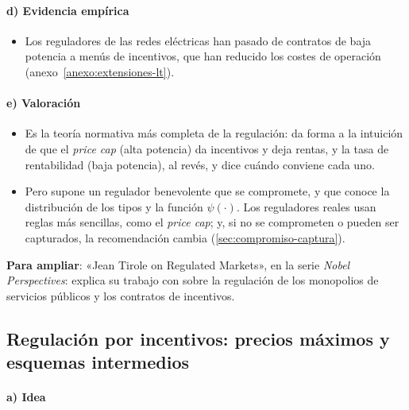 \documentclass[11pt]{article}
\begin{document}
\paragraph{d) Evidencia empírica}

\begin{itemize}
\item Los reguladores de las redes eléctricas han pasado de contratos de baja potencia a menús de incentivos, que han reducido los costes de operación\nocite{Joskow2014Incentive} (anexo~\ref{anexo:extensiones-lt}).
\end{itemize}

\paragraph{e) Valoración}

\begin{itemize}
\item Es la teoría normativa más completa de la regulación: da forma a la intuición de que el \emph{price cap} (alta potencia) da incentivos y deja rentas, y la tasa de rentabilidad (baja potencia), al revés, y dice cuándo conviene cada uno.
\item Pero supone un regulador benevolente que se compromete, y que conoce la distribución de los tipos y la función $\psi(\cdot)$. Los reguladores reales usan reglas más sencillas, como el \emph{price cap}; y, si no se comprometen o pueden ser capturados, la recomendación cambia (\ref{sec:compromiso-captura}).
\end{itemize}

\begin{anotaciones}
\textbf{Para ampliar}: «Jean Tirole on Regulated Markets», en la serie \emph{Nobel Perspectives}\nocite{UBS2026TiroleNobelPerspectives}:  explica su trabajo con  sobre la regulación de los monopolios de servicios públicos y los contratos de incentivos.
\end{anotaciones}

\subsection{Regulación por incentivos:\cortetitulo{} precios máximos y esquemas intermedios}\label{sec:price-cap}

\paragraph{a) Idea}
\end{document}

